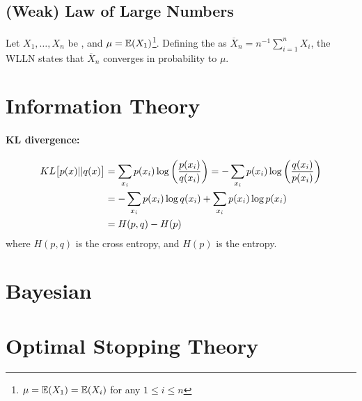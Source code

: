 \documentclass[11pt]{article}
\begin{document}
\subsection{(Weak) Law of Large Numbers}
Let $X_1, \dots, X_n$ be , and $\mu = \mathbb{E}(X_1)$\footnote{$\mu = \mathbb{E}(X_1) =
  \mathbb{E}(X_i)$ for any $1 \leq i \leq n$}. Defining the  as
$\overline{X}_n = n^{-1} \sum_{i=1}^n X_i$, the WLLN states that $\overline{X}_n$
converges in probability to $\mu$. 

\section{Information Theory}
\paragraph{KL divergence:}
\begin{align}
  KL\big[p(x) || q(x)\big] &= \sum_{x_i} p(x_i) \log \left( \frac{p(x_i)}{q(x_i)} \right)
                             = -\sum_{x_i} p(x_i) \log \left( \frac{q(x_i)}{p(x_i)} \right)
                             \nonumber\\ 
                           &= -\sum_{x_i} p(x_i) \log q(x_i) + \sum_{x_i} p(x_i) \log
                             p(x_i) \nonumber\\ 
                           &= H(p,q) - H(p)
\end{align}
where $H(p,q)$ is the cross entropy, and $H(p)$ is the entropy.


\section{Bayesian}



\section{Optimal Stopping Theory}



\newpage
\printbibliography[heading=bibintoc]

\end{document}

